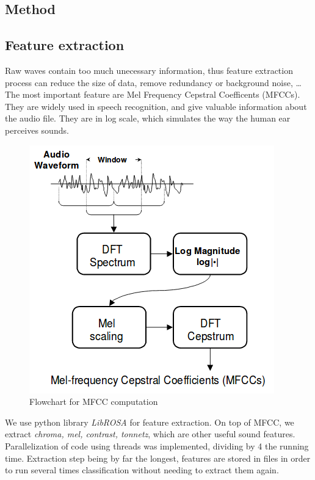 \documentclass[final]{beamer}
\begin{document}
\begin{frame}[t]
\begin{multicols}{3}
\section{Method}

	\subsection{Feature extraction}

		Raw waves contain too much unecessary information, thus feature extraction process can reduce the size of data, remove redundancy or background noise, \dots \\

		The most important feature are Mel Frequency Cepstral Coefficents (MFCCs). They are widely used in speech recognition, and give valuable information about the audio file. They are in log scale, which simulates the way the human ear perceives sounds.\\

		\begin{figure}
		\centering
		\includegraphics[width=0.8\columnwidth]{steps_mfcc.png}
		\caption{Flowchart for MFCC computation}
		\end{figure}

		We use python library \textit{LibROSA} for feature extraction. On top of MFCC, we extract \textit{chroma, mel, contrast, tonnetz}, which are other useful sound features. Parallelization of code using threads was implemented, dividing by 4 the running time. Extraction step being by far the longest, features are stored in files in order to run several times classification without needing to extract them again.


\end{multicols}
\end{frame}
\end{document}

